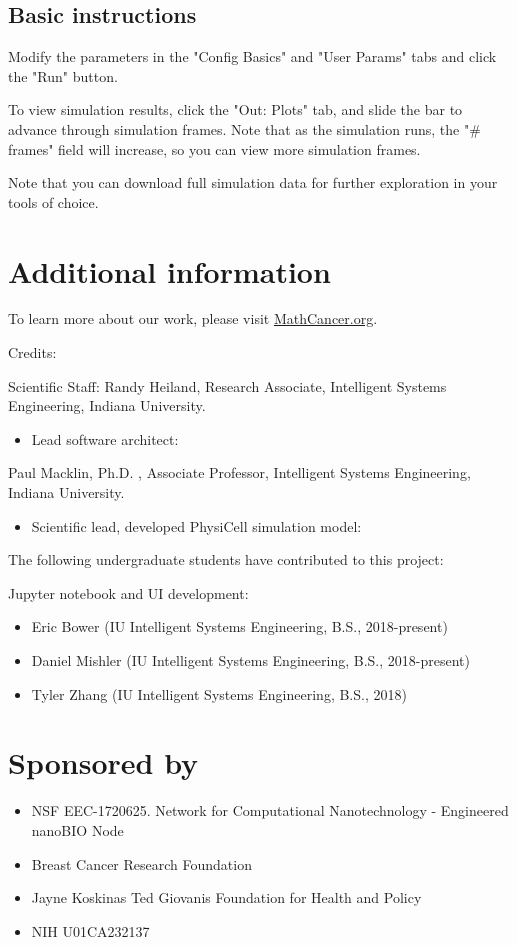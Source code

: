 \documentclass{article}
\begin{document}
\subsection{Basic
instructions}\label{basic-instructions}

Modify the parameters in the "Config Basics" and "User Params" tabs
and click the "Run" button.

To view simulation results, click the "Out: Plots" tab, and slide the bar to
advance through simulation frames. Note that as the simulation runs, the
"\# frames" field will increase, so you can view more
simulation frames.

Note that you can download full simulation data for further exploration
in your tools of choice.

\section{Additional information}
To learn more about our work, please visit \href{http://mathCancer.org}{MathCancer.org}.

Credits:

Scientific Staff:
Randy Heiland, Research Associate, Intelligent Systems Engineering, Indiana University.
\begin{itemize}
\item Lead software architect:
\end{itemize}

Paul Macklin, Ph.D. , Associate Professor, Intelligent Systems Engineering, Indiana University.
\begin{itemize}
\item Scientific lead, developed PhysiCell simulation model:
\end{itemize}

The following undergraduate students have contributed to this project:

Jupyter notebook and UI development:
\begin{itemize}
\item Eric Bower (IU Intelligent Systems Engineering, B.S., 2018-present)
\item Daniel Mishler (IU Intelligent Systems Engineering, B.S., 2018-present)
\item Tyler Zhang (IU Intelligent Systems Engineering, B.S., 2018)
\end{itemize}


\section{Sponsored by}
\begin{itemize}
\item NSF EEC-1720625. Network for Computational Nanotechnology - Engineered nanoBIO Node
\item Breast Cancer Research Foundation 
\item Jayne Koskinas Ted Giovanis Foundation for Health and Policy
\item NIH U01CA232137
\end{itemize}

\end{document}
